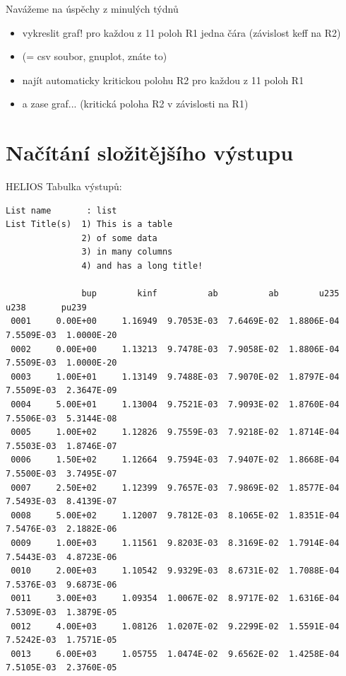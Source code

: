 \documentclass{beamer}
\begin{document}
\begin{frame}{Navážeme na úspěchy z minulých týdnů}
  \begin{itemize}
    \item vykreslit graf! pro každou z 11 poloh R1 jedna čára (závislost keff na R2)
    \item (= csv soubor, gnuplot, znáte to)
    \item najít automaticky kritickou polohu R2 pro každou z 11 poloh R1
    \item a zase graf... (kritická poloha R2 v závislosti na R1)
  \end{itemize}
\end{frame}

\section{Načítání složitějšího výstupu}

\begin{frame}[fragile]{HELIOS}
  Tabulka výstupů:
  \scriptsize
  \begin{verbatim}
List name       : list
List Title(s)  1) This is a table
               2) of some data
               3) in many columns
               4) and has a long title!

               bup        kinf          ab          ab        u235        u238       pu239
 0001     0.00E+00     1.16949  9.7053E-03  7.6469E-02  1.8806E-04  7.5509E-03  1.0000E-20
 0002     0.00E+00     1.13213  9.7478E-03  7.9058E-02  1.8806E-04  7.5509E-03  1.0000E-20
 0003     1.00E+01     1.13149  9.7488E-03  7.9070E-02  1.8797E-04  7.5509E-03  2.3647E-09
 0004     5.00E+01     1.13004  9.7521E-03  7.9093E-02  1.8760E-04  7.5506E-03  5.3144E-08
 0005     1.00E+02     1.12826  9.7559E-03  7.9218E-02  1.8714E-04  7.5503E-03  1.8746E-07
 0006     1.50E+02     1.12664  9.7594E-03  7.9407E-02  1.8668E-04  7.5500E-03  3.7495E-07
 0007     2.50E+02     1.12399  9.7657E-03  7.9869E-02  1.8577E-04  7.5493E-03  8.4139E-07
 0008     5.00E+02     1.12007  9.7812E-03  8.1065E-02  1.8351E-04  7.5476E-03  2.1882E-06
 0009     1.00E+03     1.11561  9.8203E-03  8.3169E-02  1.7914E-04  7.5443E-03  4.8723E-06
 0010     2.00E+03     1.10542  9.9329E-03  8.6731E-02  1.7088E-04  7.5376E-03  9.6873E-06
 0011     3.00E+03     1.09354  1.0067E-02  8.9717E-02  1.6316E-04  7.5309E-03  1.3879E-05
 0012     4.00E+03     1.08126  1.0207E-02  9.2299E-02  1.5591E-04  7.5242E-03  1.7571E-05
 0013     6.00E+03     1.05755  1.0474E-02  9.6562E-02  1.4258E-04  7.5105E-03  2.3760E-05
  \end{verbatim}
\end{frame}
\end{document}
